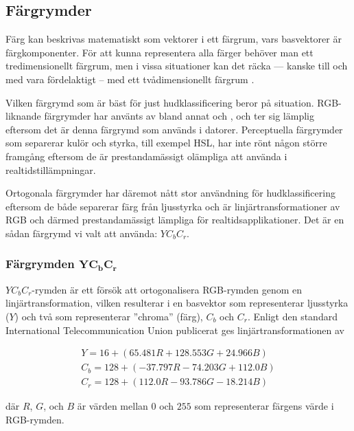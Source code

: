\documentclass[../rapport_MVEX01-11-05]{subfiles}
\begin{document}
\subsection{Färgrymder}\label{sec:fargrymder}

Färg kan beskrivas matematiskt som vektorer i ett färgrum, vars
basvektorer är färgkomponenter. För att kunna representera alla färger
behöver man ett tredimensionellt färgrum, men i vissa situationer kan
det räcka --- kanske till och med vara fördelaktigt -- med ett
tvådimensionellt färgrum \cite{Kakumanu07}.


Vilken färgrymd som är bäst för just hudklassificering beror på
situation. RGB-liknande färgrymder har använts av bland annat
 och , och ter sig lämplig
eftersom det är denna färgrymd som används i datorer. Perceptuella
färgrymder som separerar kulör och styrka, till exempel HSL, har inte
rönt någon större framgång eftersom de är prestandamässigt olämpliga
att använda i realtidstillämpningar.

Ortogonala färgrymder har däremot nått stor användning för
hudklassificering \cite{Hsu02,Elmezain08,Hassanpour08} eftersom de
både separerar färg från ljusstyrka och är linjärtransformationer av
RGB och därmed prestandamässigt lämpliga för realtidsapplikationer.
Det är en sådan färgrymd vi valt att använda: $YC_bC_r$.

\subsubsection[Färgrymden $\mathrm{YC_bC_r}$]{Färgrymden $\mathbf{YC_bC_r}$}

$YC_bC_r$-rymden är ett försök att ortogonalisera RGB-rymden genom en
linjärtransformation, vilken resulterar i en basvektor som
representerar ljusstyrka ($Y$) och två som representerar ''chroma''
(färg), $C_b$ och $C_r$. Enligt den standard International
Telecommunication Union publicerat \cite{ITU-BT601} ges
linjärtransformationen av

\begin{equation*}
  \label{eq:farg:ycbcr}
  \begin{gathered}
  Y   = 16  + ( 65.481R + 128.553G + 24.966B)\\
  C_b = 128 + (-37.797R - 74.203G  + 112.0B )\\
  C_r = 128 + (112.0R   - 93.786G  - 18.214B)
  \end{gathered}
\end{equation*}

där $R$, $G$, och $B$ är värden mellan $0$ och $255$ som representerar
färgens värde i RGB-rymden.
\end{document}
